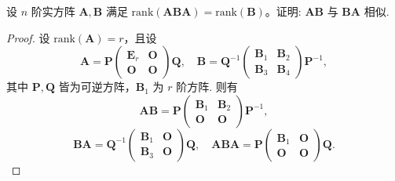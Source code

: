 \documentclass[../../main.tex]{subfiles}%
\begin{document}
\begin{example}
设 \( n \) 阶实方阵 \( \boldsymbol{A},\boldsymbol{B} \) 满足 \( \mathrm{rank}(\boldsymbol{ABA}) = \mathrm{rank}(\boldsymbol{B}) \)。证明: \( \boldsymbol{AB} \) 与 \( \boldsymbol{BA} \) 相似.
\end{example}
\begin{proof}
设 \( \mathrm{rank}(\boldsymbol{A}) = r \)，且设
\[
\boldsymbol{A} = \boldsymbol{P} \begin{pmatrix} \boldsymbol{E}_r & \boldsymbol{O} \\ \boldsymbol{O} & \boldsymbol{O} \end{pmatrix} \boldsymbol{Q}, \quad \boldsymbol{B} = \boldsymbol{Q}^{-1} \begin{pmatrix} \boldsymbol{B}_1 & \boldsymbol{B}_2 \\ \boldsymbol{B}_3 & \boldsymbol{B}_4 \end{pmatrix} \boldsymbol{P}^{-1},
\]
其中 \( \boldsymbol{P},\boldsymbol{Q} \) 皆为可逆方阵，\( \boldsymbol{B}_1 \) 为 \( r \) 阶方阵. 则有
\[
\boldsymbol{AB} = \boldsymbol{P} \begin{pmatrix} \boldsymbol{B}_1 & \boldsymbol{B}_2 \\ \boldsymbol{O} & \boldsymbol{O} \end{pmatrix} \boldsymbol{P}^{-1},
\]
\[
\boldsymbol{BA} = \boldsymbol{Q}^{-1} \begin{pmatrix} \boldsymbol{B}_1 & \boldsymbol{O} \\ \boldsymbol{B}_3 & \boldsymbol{O} \end{pmatrix} \boldsymbol{Q}, \quad \boldsymbol{ABA} = \boldsymbol{P} \begin{pmatrix} \boldsymbol{B}_1 & \boldsymbol{O} \\ \boldsymbol{O} & \boldsymbol{O} \end{pmatrix} \boldsymbol{Q}.
\]


\end{proof}
\end{document}
